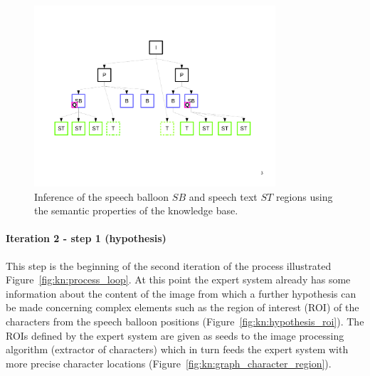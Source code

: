  \begin{figure}[!ht]  %
   \centering
  \includegraphics[trim= 30px 168px 20px 110px, clip, width=0.8\textwidth]{graph_infer_1.pdf}
  \caption[Inference of the speech balloon $SB$ and speech text $ST$ regions using the semantic properties of the knowledge base]{Inference of the speech balloon $SB$ and speech text $ST$ regions using the semantic properties of the knowledge base.%
  }
  \label{fig:kn:graph_specific_types}
 \end{figure}

\paragraph{Iteration 2 - step 1 (hypothesis)} %
\label{par:step_4}
This step is the beginning of the second iteration of the process illustrated Figure~\ref{fig:kn:process_loop}.
At this point the expert system already has some information about the content of the image from which a further hypothesis can be made concerning complex elements such as the region of interest (ROI) of the characters from the speech balloon positions (Figure~\ref{fig:kn:hypothesis_roi}).
The ROIs defined by the expert system are given as seeds to the image processing algorithm (extractor of characters) which in turn feeds the expert system with more precise character locations (Figure~\ref{fig:kn:graph_character_region}).


